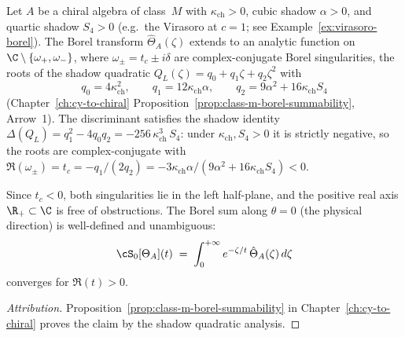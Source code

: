 \begin{proposition}
\label{prop:class-m-borel-summability-bridge}
Let $A$ be a chiral algebra of class~$M$ with $\kappa_{\mathrm{ch}} > 0$, cubic shadow $\alpha > 0$, and quartic shadow $S_4 > 0$ \textup{(}e.g.\ the Virasoro at $c = 1$; see Example~\textup{\ref{ex:virasoro-borel}}\textup{)}. The Borel transform $\hat{\Theta}_A(\zeta)$ extends to an analytic function on $\C \setminus \{\omega_+, \omega_-\}$, where $\omega_\pm = t_c \pm i\delta$ are complex-conjugate Borel singularities, the roots of the shadow quadratic $Q_L(\zeta) = q_0 + q_1 \zeta + q_2 \zeta^2$ with
\[
 q_0 = 4\kappa_{\mathrm{ch}}^2, \qquad q_1 = 12\kappa_{\mathrm{ch}}\alpha, \qquad q_2 = 9\alpha^2 + 16\kappa_{\mathrm{ch}} S_4
\]
\textup{(}Chapter~\textup{\ref{ch:cy-to-chiral}} Proposition~\textup{\ref{prop:class-m-borel-summability}}, Arrow~1\textup{)}. The discriminant satisfies the shadow identity $\Delta(Q_L) = q_1^2 - 4 q_0 q_2 = -256\,\kappa_{\mathrm{ch}}^3\, S_4$: under $\kappa_{\mathrm{ch}}, S_4 > 0$ it is strictly negative, so the roots are complex-conjugate with $\Re(\omega_\pm) = t_c = -q_1/(2q_2) = -3\kappa_{\mathrm{ch}}\alpha/(9\alpha^2 + 16\kappa_{\mathrm{ch}} S_4) < 0$.

\medskip
Since $t_c < 0$, both singularities lie in the left half-plane, and the positive real axis $\R_+ \subset \C$ is free of obstructions. The Borel sum along $\theta = 0$ \textup{(}the physical direction\textup{)} is well-defined and unambiguous:
\[
 \cS_0[\Theta_A](t) \;=\; \int_0^{+\infty} e^{-\zeta/t}\, \hat{\Theta}_A(\zeta)\, d\zeta
\]
converges for $\Re(t) > 0$.
\end{proposition}

\begin{proof}[Attribution]
Proposition~\ref{prop:class-m-borel-summability} in Chapter~\ref{ch:cy-to-chiral} proves the claim by the shadow quadratic analysis.
\end{proof}

